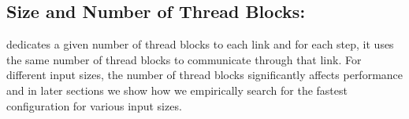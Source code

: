 \subsection{Size and Number of Thread Blocks:} \tool{} dedicates a
given number of thread blocks to each link and for each step, it uses
the same number of thread blocks to communicate through that link. For
different input sizes, the number of thread blocks significantly
affects performance and in later sections we show how we empirically
search for the fastest configuration for various input sizes.




